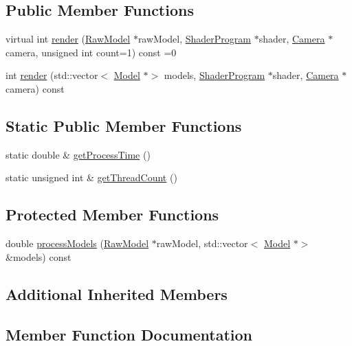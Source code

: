 \subsection*{Public Member Functions}
\begin{DoxyCompactItemize}
\item 
virtual int \hyperlink{classpcs_1_1Renderer_aba6bdcf38357cdfea898e0f7b3cb1757}{render} (\hyperlink{classpcs_1_1RawModel}{Raw\+Model} $\ast$raw\+Model, \hyperlink{classpcs_1_1ShaderProgram}{Shader\+Program} $\ast$shader, \hyperlink{classpcs_1_1Camera}{Camera} $\ast$camera, unsigned int count=1) const =0
\item 
int \hyperlink{classpcs_1_1Renderer_a4d722540c7af2dfee44726d18aa0ce05}{render} (std\+::vector$<$ \hyperlink{classpcs_1_1Model}{Model} $\ast$$>$ models, \hyperlink{classpcs_1_1ShaderProgram}{Shader\+Program} $\ast$shader, \hyperlink{classpcs_1_1Camera}{Camera} $\ast$camera) const
\end{DoxyCompactItemize}
\subsection*{Static Public Member Functions}
\begin{DoxyCompactItemize}
\item 
static double \& \hyperlink{classpcs_1_1Renderer_a1b1eba1dbd9d5fa3293bfe2295b0ad9d}{get\+Process\+Time} ()
\item 
static unsigned int \& \hyperlink{classpcs_1_1Renderer_a928518fe0b60785048b1a7780df14303}{get\+Thread\+Count} ()
\end{DoxyCompactItemize}
\subsection*{Protected Member Functions}
\begin{DoxyCompactItemize}
\item 
double \hyperlink{classpcs_1_1Renderer_adae0f95f56f7261ec52ea32eaa3ad27b}{process\+Models} (\hyperlink{classpcs_1_1RawModel}{Raw\+Model} $\ast$raw\+Model, std\+::vector$<$ \hyperlink{classpcs_1_1Model}{Model} $\ast$$>$ \&models) const
\end{DoxyCompactItemize}
\subsection*{Additional Inherited Members}


\subsection{Member Function Documentation}
\mbox{\label{classpcs_1_1Renderer_a1b1eba1dbd9d5fa3293bfe2295b0ad9d}} 
